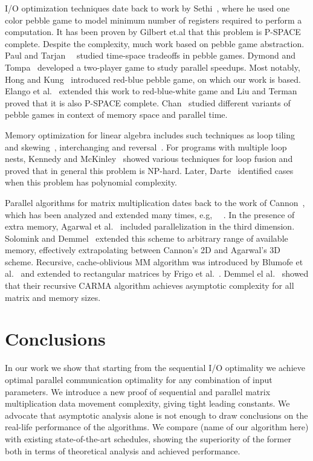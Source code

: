 \documentclass[sigplan,review,anonymous]{acmart}\settopmatter{printfolios=true,printccs=false,printacmref=false}
\begin{document}
I/O optimization techniques date back to work by 
Sethi~\cite{completeRegisterProblems}, where he used one color pebble game to 
model minimum number of registers required to perform a computation. It has 
been proven by Gilbert et.al \cite{pebblegameregister} that this problem is 
P-SPACE complete. Despite the complexity, much work based on pebble game 
abstraction. Paul and Tarjan~~\cite{pebbleTradeoffs} studied time-space 
tradeoffs in pebble games. Dymond and Tompa~\cite{dymond2playerpebblegame} 
developed a 
two-player game to study parallel speedups. Most notably, Hong and 
Kung~\cite{redblue} introduced red-blue pebble game, on which our work is 
based. Elango et al.~\cite{redbluewhite} extended this work to red-blue-white 
game and Liu and Terman~\cite{redblueHard} proved that it is also P-SPACE 
complete. Chan~\cite{justApebbleGame} studied different variants of pebble 
games in context of memory space and parallel time.

Memory optimization for linear algebra includes such techniques as loop tiling 
and skewing~\cite{tiling}, interchanging and reversal~\cite{tiling2}. For 
programs with multiple loop nests, Kennedy and McKinley~\cite{loopFusion} 
showed various techniques for loop fusion and proved that in general this 
problem is NP-hard. Later, 
Darte~\cite{loopFusionComplexity} identified cases when this problem has 
polynomial complexity.

Parallel algorithms for matrix multiplication dates back to the work of 
Cannon~\cite{Cannon}, which has been analyzed and extended many times, e.g, 
~\cite{MManalysis}~\cite{generalCannon}. In the presence of extra memory, 
Agarwal et al.~\cite{summa3d} included parallelization in the third dimension. 
Solomink and Demmel~\cite{25d} extended this scheme to arbitrary range of 
available memory, effectively extrapolating between Cannon's 2D and Agarwal's 
3D scheme. Recursive, cache-oblivious MM algorithm was introduced by Blumofe 
et al.~\cite{recursiveMM} and extended to rectangular matrices by Frigo et 
al.~\cite{recursiveRectangularMM}. Demmel el al.~\cite{CARMA} showed that their 
recursive CARMA algorithm achieves asymptotic complexity for all matrix and 
memory sizes. 

\section{Conclusions}
In our work we show that starting from the sequential I/O optimality we achieve 
optimal parallel communication optimality for any combination of input 
parameters. We introduce a new proof of sequential and parallel matrix 
multiplication data movement complexity, giving tight leading constants. We 
advocate that asymptotic analysis alone is not enough to draw conclusions on 
the real-life performance of the algorithms. We 
compare (name of our algorithm here) with existing state-of-the-art schedules, 
showing the 
superiority of the former both in terms of theoretical analysis and achieved 
performance.
\end{document}
